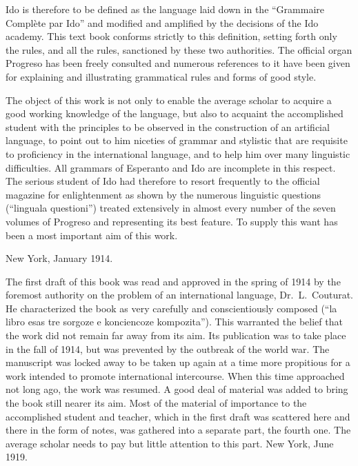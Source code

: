 Ido is therefore to be defined as the language laid down in the “Grammaire Complète par Ido” and modified and amplified by the decisions of the Ido academy. This text book conforms strictly to this definition, setting forth only the rules, and all the rules, sanctioned by these two authorities. The official organ Progreso has been freely consulted and numerous references to it have been given for explaining and illustrating grammatical rules and forms of good style. 

The object of this work is not only to enable the average scholar to acquire a good working knowledge of the language, but also to acquaint the accomplished student with the principles to be observed in the construction of an artificial language, to point out to him niceties of grammar and stylistic that are requisite to proficiency in the international language, and to help him over many linguistic difficulties. All grammars of Esperanto and Ido are incomplete in this respect. The serious student of Ido had therefore to resort frequently to the official magazine for enlightenment as shown by the numerous linguistic questions (“linguala questioni”) treated extensively in almost every number of the seven volumes of Progreso and representing its best feature. To supply this want has been a most important aim of this work. \begin{flushright}New York, January 1914.\end{flushright}

The first draft of this book was read and approved in the spring of 1914 by the foremost authority on the problem of an international language, Dr.~L.~Couturat. He characterized the book as very carefully and conscientiously composed (“la libro esas tre sorgoze e konciencoze kompozita”). This warranted the belief that the work did not remain far away from its aim. Its publication was to take place in the fall of 1914, but was prevented by the outbreak of the world war. The manuscript was locked away to be taken up again at a time more propitious for a work intended to promote international intercourse. When this time approached not long ago, the work was resumed. A good deal of material was added to bring the book still nearer its aim. Most of the material of importance to the accomplished student and teacher, which in the first draft was scattered here and there in the form of notes, was gathered into a separate part, the fourth one. The average scholar needs to pay but little attention to this part. 
\RaggedLeft New York, June 1919. \justifying
